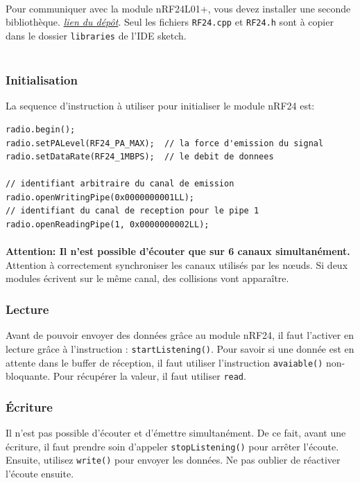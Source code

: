 \documentclass[a4paper, titlepage, oneside, 12pt]{article}%
\begin{document}
\paragraph{}
Pour communiquer avec la module nRF24L01+, vous devez installer une seconde bibliothèque.
\href{https://github.com/stanleyseow/RF24}{\textit{lien du dépôt}}. Seul les fichiers \texttt{RF24.cpp} et \texttt{RF24.h} sont à copier dans le dossier \texttt{libraries} de l'IDE sketch.
\\ \\
\subsubsection{Initialisation}
La sequence d'instruction à utiliser pour initialiser le module nRF24 est:\\

\begin{lstlisting}
radio.begin();
radio.setPALevel(RF24_PA_MAX);	// la force d'emission du signal
radio.setDataRate(RF24_1MBPS);	// le debit de donnees

// identifiant arbitraire du canal de emission 
radio.openWritingPipe(0x0000000001LL);
// identifiant du canal de reception pour le pipe 1
radio.openReadingPipe(1, 0x0000000002LL);
\end{lstlisting}
\paragraph{}
\textbf{Attention: Il n'est possible d’écouter que sur 6 canaux simultanément.\\}
Attention à correctement synchroniser les canaux utilisés par les nœuds. Si deux modules écrivent sur le même canal, des collisions vont apparaître.

\subsubsection{Lecture}
Avant de pouvoir envoyer des données grâce au module nRF24, il faut l'activer en lecture grâce à l'instruction : \texttt{startListening()}.
Pour savoir si une donnée est en attente dans le buffer de réception, il faut utiliser l'instruction \texttt{avaiable()} non-bloquante.
Pour récupérer la valeur, il faut utiliser \texttt{read}.

\subsubsection{Écriture}
Il n'est pas possible d'écouter et d'émettre simultanément. De ce fait, avant une écriture, il faut prendre soin d'appeler \texttt{stopListening()} pour arrêter l'écoute. Ensuite, utilisez \texttt{write()} pour envoyer les données.
Ne pas oublier de réactiver l'écoute ensuite.
\end{document}

